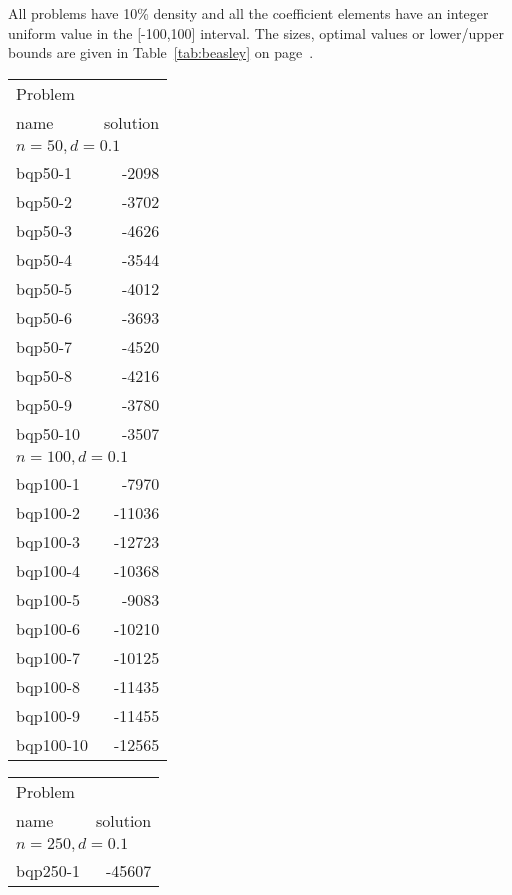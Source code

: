 \documentclass[a4paper, 12pt]{article}
\begin{document}
All problems have 10\% density and all the coefficient elements have
an integer uniform value in the [-100,100] interval. The sizes,
optimal values or lower/upper bounds are given in
Table~\ref{tab:beasley} on page~\pageref{tab:beasley}.

\begin{table}
\begin{center}
\begin{minipage}{28ex}
\begin{tabular}{|l|r|}
\hline
Problem& \\
name &\multicolumn{1}{|c|}{solution}\\
\hline
\multicolumn{2}{|l|}{$n=50, d=0.1$}\\
\hline
bqp50-1  & -2098 \\
bqp50-2  & -3702 \\
bqp50-3  & -4626 \\
bqp50-4  & -3544 \\
bqp50-5  & -4012 \\
bqp50-6  & -3693 \\
bqp50-7  & -4520 \\
bqp50-8  & -4216 \\
bqp50-9  & -3780 \\
bqp50-10 & -3507 \\
\hline
\multicolumn{2}{|l|}{$n=100, d=0.1$}\\
\hline
bqp100-1  &  -7970 \\
bqp100-2  & -11036 \\
bqp100-3  & -12723 \\
bqp100-4  & -10368 \\
bqp100-5  &  -9083 \\
bqp100-6  & -10210 \\
bqp100-7  & -10125 \\
bqp100-8  & -11435 \\
bqp100-9  & -11455 \\
bqp100-10 & -12565 \\
\hline
\end{tabular}
\end{minipage}
\begin{minipage}{38ex}
\begin{center}
\begin{tabular}{|l|r|}
\hline
Problem&  \\
name &\multicolumn{1}{|c|}{solution} \\
\hline
\multicolumn{2}{|l|}{$n=250, d=0.1$}\\
\hline
bqp250-1  & -45607  \\

\end{tabular}
\end{center}
\end{minipage}
\end{center}
\end{table}
\end{document}
